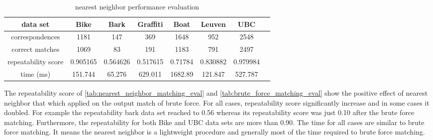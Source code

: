 \begin{table}[H]
  \begin{tabular}{| c || c | c | c | c | c | c | c |}
      \hline
      data set & Bike & Bark & Graffiti & Boat & Leuven & UBC \\ \hline \hline
      correspondences & 1181 & 147 & 369 & 1648 & 952 & 2548 \\ \hline
      correct matches & 1069 & 83 & 191 & 1183 & 791 & 2497 \\ \hline
      repeatability score & 0.905165 & 0.564626 & 0.517615 & 0.71784 & 0.830882 & 0.979984\\ \hline
      time (ms) & 151.744 & 65.276 & 629.011 & 1682.89 & 121.847 & 527.787 \\ \hline
  \end{tabular}
  \caption{nearest neighbor performance evaluation} \label{tab:nearest_neighbor_matching_eval}
\end{table}

The repeatability score of \autoref{tab:nearest_neighbor_matching_eval} and \autoref{tab:brute_force_matching_eval} show the positive effect of nearest neighbor that which applied on the output match of brute force. For all cases, repeatability score significantly increase and in some cases it doubled. For example the repeatability bark data set reached to 0.56 whereas its repeatability score was just 0.10 after the brute force matching. Furthermore, the repeatability for both Bike and UBC data sets are more than 0.90. The time for all cases are similar to brute force matching. It means the nearest neighbor is a lightweight procedure and generally most of the time required to brute force matching.

